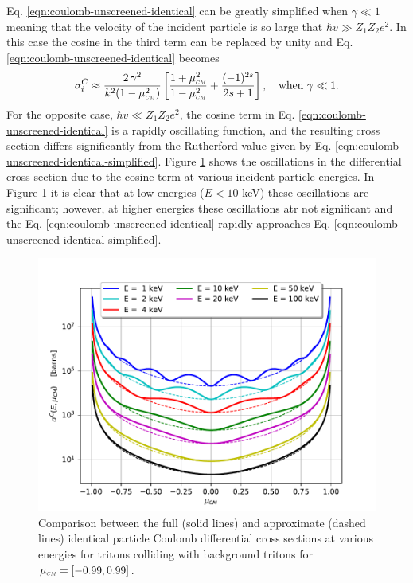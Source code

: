 Eq. \eqref{eqn:coulomb-unscreened-identical} can be greatly simplified when $\gamma \ll 1$ meaning that the velocity of the incident particle is so large that $\hbar v \gg Z_1 Z_2 e^2$. In this case the cosine in the third term can be replaced by unity and Eq. \eqref{eqn:coulomb-unscreened-identical} becomes
\begin{equation} \label{eqn:coulomb-unscreened-identical-simplified}
   \sigma_{i}^{C} \approx \dfrac{2 \, \gamma^2}{k^2 (1 - \mucm^2)} \left[\dfrac{1+ \mucm^2}{1-\mucm^2} + \dfrac{(-1)^{2s}}{2s+1}\right], \quad \text{when} \,\, \gamma \ll 1.
\end{equation}
For the opposite case, $\hbar v \ll Z_1 Z_2 e^2$, the cosine term in Eq. \eqref{eqn:coulomb-unscreened-identical} is a rapidly oscillating function, and the resulting cross section differs significantly from the Rutherford value given by Eq. \eqref{eqn:coulomb-unscreened-identical-simplified}. Figure \ref{fig:coulomb-identical-2d} shows the oscillations in the differential cross section due to the cosine term at various incident particle energies. In Figure \ref{fig:coulomb-identical-2d} it is clear that at low energies ($E < 10$ keV) these oscillations are significant; however, at higher energies these oscillations atr not significant and the Eq. \eqref{eqn:coulomb-unscreened-identical} rapidly approaches Eq. \eqref{eqn:coulomb-unscreened-identical-simplified}.

\begin{figure}[!htb]
    \centering
    \includegraphics[scale=0.75]{../figures/interaction_physics/sigma-Ci-2d.pdf}
    \caption{Comparison between the full (solid lines) and approximate (dashed lines) identical particle Coulomb differential cross sections at various energies for tritons colliding with background tritons for $\mucm = [-0.99,0.99]$.}
    \label{fig:coulomb-identical-2d}
\end{figure}

